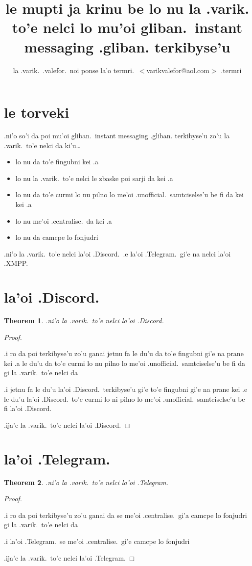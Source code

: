 \documentclass{article}
\title{le mupti ja krinu be lo nu la .varik. to'e nelci lo mu'oi gliban.\ instant messaging .gliban. terkibyse'u}
\author{la .varik.\ .valefor.\ noi ponse la'o termri.\ $<$varikvalefor@aol.com$>$ .termri}
\newtheorem{thm}{Theorem}
\begin{document}
\maketitle

\section{le torveki}
.ni'o so'i da poi mu'oi gliban.\ instant messaging .gliban. terkibyse'u zo'u la .varik.\ to'e nelci da ki'u\ldots
\begin{itemize}
	\item lo nu da to'e fingubni kei .a
	\item lo nu la .varik.\ to'e nelci le zbaske poi sarji da kei .a
	\item lo nu da to'e curmi lo nu pilno lo me'oi .unofficial.\ samtciselse'u be fi da kei kei .a
	\item lo nu me'oi .centralise.\ da kei .a
	\item lo nu da camcpe lo fonjudri
\end{itemize}

.ni'o la .varik.\ to'e nelci la'oi .Discord.\ .e la'oi .Telegram.\ gi'e na nelci la'oi .XMPP.
\section{la'oi .Discord.}
\begin{thm}
	.ni'o la .varik.\ to'e nelci la'oi .Discord.
\end{thm}
\begin{proof}
	${}$

	.i ro da poi terkibyse'u zo'u ganai jetnu fa le du'u da to'e fingubni gi'e na prane kei .a le du'u da to'e curmi lo nu pilno lo me'oi .unofficial.\ samtciselse'u be fi da gi la .varik.\ to'e nelci da

	.i jetnu fa le du'u la'oi .Discord.\ terkibyse'u gi'e to'e fingubni gi'e na prane kei .e le du'u la'oi .Discord.\ to'e curmi lo ni pilno lo me'oi .unofficial.\ samtciselse'u be fi la'oi .Discord.

	.ija'e la .varik.\ to'e nelci la'oi .Discord.
\end{proof}

\section{la'oi .Telegram.}
\begin{thm}
	.ni'o la .varik.\ to'e nelci la'oi .Telegram.
\end{thm}
\begin{proof}
	${}$

	.i ro da poi terkibyse'u zo'u ganai da se me'oi .centralise.\ gi'a camcpe lo fonjudri gi la .varik.\ to'e nelci da

	.i la'oi .Telegram.\ se me'oi .centralise.\ gi'e camcpe lo fonjudri

	.ija'e la .varik.\ to'e nelci la'oi .Telegram.
\end{proof}
\end{document}
